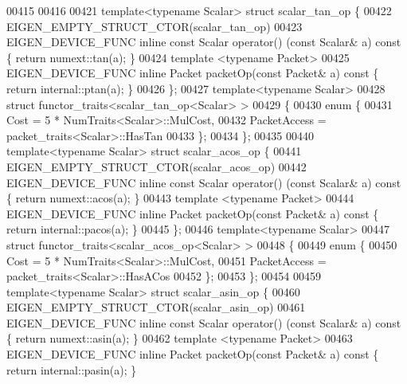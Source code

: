 \begin{DoxyCode}
00415 
00416 
00421 \textcolor{keyword}{template}<\textcolor{keyword}{typename} Scalar> \textcolor{keyword}{struct }scalar\_tan\_op \{
00422   EIGEN\_EMPTY\_STRUCT\_CTOR(scalar\_tan\_op)
00423   EIGEN\_DEVICE\_FUNC \textcolor{keyword}{inline} \textcolor{keyword}{const} Scalar operator() (\textcolor{keyword}{const} Scalar& a)\textcolor{keyword}{ const }\{ \textcolor{keywordflow}{return} numext::tan(a); \}
00424   \textcolor{keyword}{template} <\textcolor{keyword}{typename} Packet>
00425   EIGEN\_DEVICE\_FUNC \textcolor{keyword}{inline} Packet packetOp(\textcolor{keyword}{const} Packet& a)\textcolor{keyword}{ const }\{ \textcolor{keywordflow}{return} internal::ptan(a); \}
00426 \};
00427 \textcolor{keyword}{template}<\textcolor{keyword}{typename} Scalar>
00428 \textcolor{keyword}{struct }functor\_traits<scalar\_tan\_op<Scalar> >
00429 \{
00430   \textcolor{keyword}{enum} \{
00431     Cost = 5 * NumTraits<Scalar>::MulCost,
00432     PacketAccess = packet\_traits<Scalar>::HasTan
00433   \};
00434 \};
00435 
00440 \textcolor{keyword}{template}<\textcolor{keyword}{typename} Scalar> \textcolor{keyword}{struct }scalar\_acos\_op \{
00441   EIGEN\_EMPTY\_STRUCT\_CTOR(scalar\_acos\_op)
00442   EIGEN\_DEVICE\_FUNC \textcolor{keyword}{inline} \textcolor{keyword}{const} Scalar operator() (\textcolor{keyword}{const} Scalar& a)\textcolor{keyword}{ const }\{ \textcolor{keywordflow}{return} numext::acos(a); \}
00443   \textcolor{keyword}{template} <\textcolor{keyword}{typename} Packet>
00444   EIGEN\_DEVICE\_FUNC \textcolor{keyword}{inline} Packet packetOp(\textcolor{keyword}{const} Packet& a)\textcolor{keyword}{ const }\{ \textcolor{keywordflow}{return} internal::pacos(a); \}
00445 \};
00446 \textcolor{keyword}{template}<\textcolor{keyword}{typename} Scalar>
00447 \textcolor{keyword}{struct }functor\_traits<scalar\_acos\_op<Scalar> >
00448 \{
00449   \textcolor{keyword}{enum} \{
00450     Cost = 5 * NumTraits<Scalar>::MulCost,
00451     PacketAccess = packet\_traits<Scalar>::HasACos
00452   \};
00453 \};
00454 
00459 \textcolor{keyword}{template}<\textcolor{keyword}{typename} Scalar> \textcolor{keyword}{struct }scalar\_asin\_op \{
00460   EIGEN\_EMPTY\_STRUCT\_CTOR(scalar\_asin\_op)
00461   EIGEN\_DEVICE\_FUNC \textcolor{keyword}{inline} \textcolor{keyword}{const} Scalar operator() (\textcolor{keyword}{const} Scalar& a)\textcolor{keyword}{ const }\{ \textcolor{keywordflow}{return} numext::asin(a); \}
00462   \textcolor{keyword}{template} <\textcolor{keyword}{typename} Packet>
00463   EIGEN\_DEVICE\_FUNC \textcolor{keyword}{inline} Packet packetOp(\textcolor{keyword}{const} Packet& a)\textcolor{keyword}{ const }\{ \textcolor{keywordflow}{return} internal::pasin(a); \}

\end{DoxyCode}

